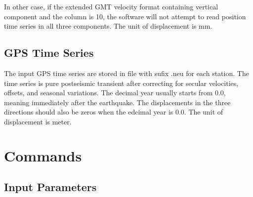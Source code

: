 \documentclass[UTF8,a4paper]{report}
\begin{document}
In other case, if the extended GMT velocity format containing vertical component and the column is 10, the software will not attempt to read position time series in all three components. The unit of displacement is mm.
\begin{center}
\end{center}

\section{GPS Time Series}
\begin{center}
\end{center}
The input GPS time series are stored in file with sufix .neu for each station. The time series is pure postseismic transient after correcting for secular velocities, offsets, and seasonal variations. The decimal year usually starts from 0.0, meaning immediately after the earthquake. The displacements in the three directions should also be zeros when the edcimal year is 0.0. The unit of displacement is meter.

\chapter{Commands}
\section{Input Parameters}
 
\end{document}
